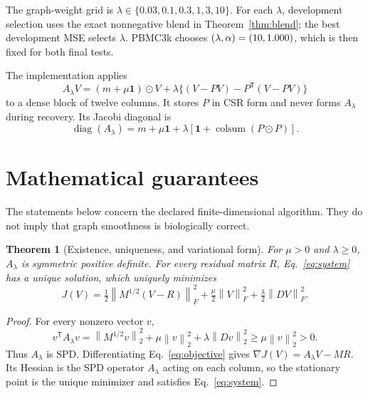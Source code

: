 \documentclass[10pt,letterpaper,twoside]{article}
\newtheorem{theorem}{Theorem}
\newcommand{\norm}[1]{\left\lVert #1\right\rVert}
\newcommand{\trans}{\mathsf T}
\begin{document}
The graph-weight grid is
$\lambda\in\{0.03,0.1,0.3,1,3,10\}$.  For each $\lambda$, development
selection uses the exact nonnegative blend in Theorem~\ref{thm:blend}; the best
development MSE selects $\lambda$.  PBMC3k chooses
$(\lambda,\alpha)=(10,1.000)$, which is then fixed for
both final tests.

The implementation applies
\begin{equation}
 A_\lambda V=(m+\mu\bm1)\odot V+\lambda\{(V-PV)-P^\trans(V-PV)\}
\label{eq:action}
\end{equation}
to a dense block of twelve columns.  It stores $P$ in CSR form and never forms
$A_\lambda$ during recovery.  Its Jacobi diagonal is
\begin{equation}
 \operatorname{diag}(A_\lambda)=m+\mu\bm1+\lambda
 \left[\bm1+\operatorname{colsum}(P\odot P)\right].
\end{equation}

\section{Mathematical guarantees}

The statements below concern the declared finite-dimensional algorithm.  They
do not imply that graph smoothness is biologically correct.

\begin{theorem}[Existence, uniqueness, and variational form]
\label{thm:spd}
For $\mu>0$ and $\lambda\ge0$, $A_\lambda$ is symmetric positive definite.
For every residual matrix $R$, Eq.~\eqref{eq:system} has a unique solution,
which uniquely minimizes
\begin{equation}
 J(V)=\tfrac12\norm{M^{1/2}(V-R)}_F^2+
 \tfrac\mu2\norm{V}_F^2+
 \tfrac\lambda2\norm{DV}_F^2.
\label{eq:objective}
\end{equation}
\end{theorem}
\begin{proof}
For every nonzero vector $v$,
\begin{equation}
 v^\trans A_\lambda v=\norm{M^{1/2}v}_2^2+\mu\norm{v}_2^2+
 \lambda\norm{Dv}_2^2\ge\mu\norm{v}_2^2>0.
\end{equation}
Thus $A_\lambda$ is SPD.  Differentiating Eq.~\eqref{eq:objective} gives
$\nabla J(V)=A_\lambda V-MR$.  Its Hessian is the SPD operator
$A_\lambda$ acting on each column, so the stationary point is the unique
minimizer and satisfies Eq.~\eqref{eq:system}.
\end{proof}
\end{document}
